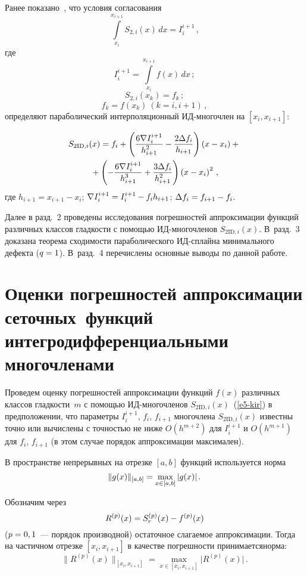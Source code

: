\begin{multicols}{2}
  Ранее показано~\cite{6-kir}, что условия согласования 
  \begin{equation*}
  \int\limits_{x_i}^{x_{i+1}} S_{2,i}(x)\,dx=I_i^{i+1}\,,
\end{equation*}
где 
$$ I_i^{i+1} 
= \int\limits_{x_i}^{x_{i+1}}f(x)\,dx\,;
$$
$$
  S_{2,i}(x_k) = f_k\,;$$
  $$
  f_k=f(x_k)\ (k=i,i+1)\,,
  $$
определяют параболический интерполяционный ИД-мно\-го\-член на 
$[x_i,x_{i+1}]$:

\noindent
\begin{multline}
S_{2\mathrm{ID},i}(x) =f_i+\left( \displaystyle\frac{\displaystyle 6\nabla I_i^{i+1}\mathstrut}{\displaystyle h^2_{i+1}\mathstrut}-\displaystyle\frac{\displaystyle 2\Delta 
f_i\mathstrut}{\displaystyle h_{i+1}\mathstrut}\right) \left( x-x_i\right) + {}\\
{}+\left( -\displaystyle\frac{\displaystyle 6\nabla I_i^{i+1}\mathstrut}{\displaystyle h^3_{i+1}\mathstrut}+ 
\displaystyle\frac{\displaystyle 3\Delta f_i\mathstrut}{\displaystyle h^2_{i+1}\mathstrut} \right) \left( x-x_i\right)^2\,,
\label{e5-kir}
\end{multline}
где $h_{i+1}=x_{i+1}-x_i$; $\nabla I_i^{i+1}\hm= I_i^{i+1}\hm-f_i h_{i+1}$; 
$\Delta f_i\hm= f_{i+1}\hm- f_i$.
  
  Далее в разд.~2 проведены исследования погрешностей аппроксимации 
функций различных классов гладкости с помощью ИД-мно\-го\-чле\-нов 
$S_{2\mathrm{ID},i}(x)$. В~разд.~3 доказана теорема сходимости параболического 
  ИД-сплай\-на минимального дефекта ($q\hm=1$). В~разд.~4 перечислены 
основные выводы по данной работе.

\section{Оценки погрешностей аппроксимации сеточных~функций 
интегродифференциальными многочленами} 
  
  Проведем оценку погрешностей аппроксимации функций $f(x)$ различных 
классов глад\-кости~$m$ с помощью ИД-мно\-го\-чле\-нов 
$S_{2\mathrm{ID},i}(x)$~(\ref{e5-kir}) в предположении, что параметры $I_i^{i+1}$, 
$f_i$, $f_{i+1}$ многочлена $S_{2\mathrm{ID},i}(x)$ известны точно или вычислены с 
точ\-ностью не ниже $O(h^{m+2})$ для $I_i^{i+1}$ и $O(h^{m+1})$ для $f_i$, 
$f_{i+1}$ (в этом случае порядок аппроксимации максимален).
  
  В пространстве непрерывных на отрезке $[a,b]$ функций используется норма 
$$
\| g(x)\|_{[a,b]} \hm = \max\limits_{x\in [a,b]} \vert g(x)\vert\,.
$$ 

Обозначим через 
$$
R^{(p)}(x)\hm= S_r^{(p)}(x)\hm- f^{(p)}(x)
$$ 
($p\hm=0, 1$~--- 
порядок производной) остаточное слагаемое аппроксимации. Тогда на 
частичном отрезке $[x_i,x_{i+1}]$ в качестве погрешности принимается\linebreak норма:
  $$
  \parallel \!R^{(p)} (x)\!\parallel_{[x_i,x_{i+1}]} = \max\limits_{x\in [x_i,x_{i+1}]} 
\vert R^{(p)}(x)\vert\,.
  $$
  

\end{multicols}
